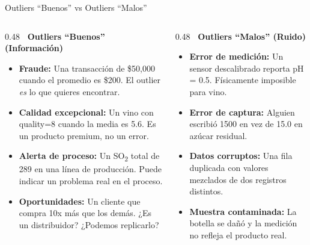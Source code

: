 \documentclass[aspectratio=169, 11pt]{beamer}
\begin{document}
\begin{frame}[shrink=10]{Outliers ``Buenos'' vs Outliers ``Malos''}
  \vspace{-4pt}
  \begin{columns}[T]
    \begin{column}{0.48\textwidth}
      {\footnotesize\bfseries\color{codeGreen} \faCheckCircle\ Outliers ``Buenos'' (Información)}
      \vspace{6pt}

      {\scriptsize
      \begin{itemize}\setlength{\itemsep}{5pt}
        \item[{\color{codeGreen}\scriptsize\faArrowRight}]
          \textbf{Fraude:} Una transacción de \$50{,}000 cuando el promedio es \$200.
          El outlier \textit{es} lo que quieres encontrar.
        \item[{\color{codeGreen}\scriptsize\faArrowRight}]
          \textbf{Calidad excepcional:} Un vino con quality=8 cuando la media es 5.6.
          Es un producto premium, no un error.
        \item[{\color{codeGreen}\scriptsize\faArrowRight}]
          \textbf{Alerta de proceso:} Un SO\textsubscript{2} total de 289 en una línea de producción.
          Puede indicar un problema real en el proceso.
        \item[{\color{codeGreen}\scriptsize\faArrowRight}]
          \textbf{Oportunidades:} Un cliente que compra 10x más que los demás.
          ¿Es un distribuidor? ¿Podemos replicarlo?
      \end{itemize}
      }
    \end{column}

    \begin{column}{0.48\textwidth}
      {\footnotesize\bfseries\color{arcaRed} \faTimesCircle\ Outliers ``Malos'' (Ruido)}
      \vspace{6pt}

      {\scriptsize
      \begin{itemize}\setlength{\itemsep}{5pt}
        \item[{\color{arcaRed}\scriptsize\faArrowRight}]
          \textbf{Error de medición:} Un sensor descalibrado reporta pH = 0.5.
          Físicamente imposible para vino.
        \item[{\color{arcaRed}\scriptsize\faArrowRight}]
          \textbf{Error de captura:} Alguien escribió 1500 en vez de 15.0
          en azúcar residual.
        \item[{\color{arcaRed}\scriptsize\faArrowRight}]
          \textbf{Datos corruptos:} Una fila duplicada con valores mezclados
          de dos registros distintos.
        \item[{\color{arcaRed}\scriptsize\faArrowRight}]
          \textbf{Muestra contaminada:} La botella se dañó y la medición
          no refleja el producto real.
      \end{itemize}
      }
    \end{column}
  \end{columns}


\end{frame}
\end{document}
